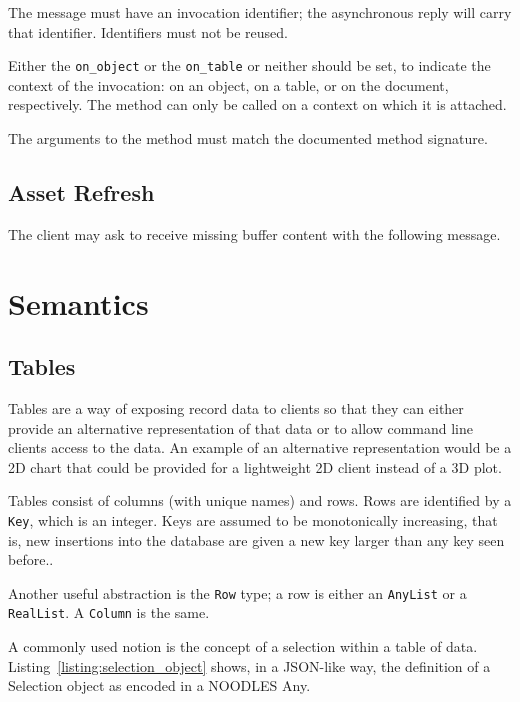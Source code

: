 \documentclass[11pt, oneside]{amsart}
\begin{document}
The message must have an invocation identifier; the asynchronous reply will carry that identifier. Identifiers must not be reused.

Either the \texttt{on\_object} or the \texttt{on\_table} or neither should be set, to indicate the context of the invocation: on an object, on a table, or on the document, respectively. The method can only be called on a context on which it is attached.

The arguments to the method must match the documented method signature.

\subsection{Asset Refresh}
\label{sec:refresh_message}

The client may ask to receive missing buffer content with the following message.




\section{Semantics}


\subsection{Tables}

Tables are a way of exposing record data to clients so that they can either provide an alternative representation of that data or to allow command line clients access to the data. An example of an alternative representation would be a 2D chart that could be provided for a lightweight 2D client instead of a 3D plot.

Tables consist of columns (with unique names) and rows. Rows are identified by a \texttt{Key}, which is an integer. Keys are assumed to be monotonically increasing, that is, new insertions into the database are given a new key larger than any key seen before..

Another useful abstraction is the \texttt{Row} type; a row is either an \texttt{AnyList} or a \texttt{RealList}. A \texttt{Column} is the same.

A commonly used notion is the concept of a selection within a table of data. Listing~\ref{listing:selection_object} shows, in a JSON-like way, the definition of a Selection object as encoded in a NOODLES Any.
\end{document}
